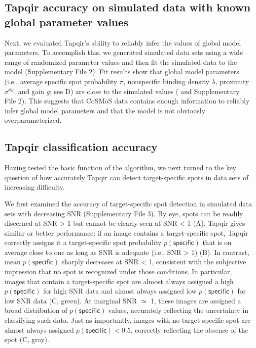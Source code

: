 \subsection{Tapqir accuracy on simulated data with known global parameter values}

Next, we evaluated Tapqir's ability to reliably infer the values of global model parameters. To  accomplish this, we generated simulated data sets using a wide range of randomized parameter values and then fit the simulated data to the model (Supplementary File 2). Fit results show that global model parameters (i.e., average specific spot probability $\pi$, nonspecific binding density $\lambda$, proximity $\sigma^{xy}$, and gain $g$; see D) are close to the simulated values ( and Supplementary File 2). This suggests that CoSMoS data contains enough information to reliably infer global model parameters and that the model is not obviously overparameterized. 

\subsection{Tapqir classification accuracy}

Having tested the basic function of the algorithm, we next turned to the key question of how accurately Tapqir can detect target-specific spots in data sets of increasing difficulty.

We first examined the accuracy of target-specific spot detection in simulated data sets with decreasing SNR (Supplementary File 3). By eye, spots can be readily discerned at SNR > 1 but cannot be clearly seen at SNR < 1 (A). Tapqir gives similar or better performance:  if an image contains a target-specific spot, Tapqir correctly assigns it a target-specific spot probability $p(\mathsf{specific})$ that is on average close to one as long as SNR is adequate (i.e., SNR > 1) (B).  In contrast, mean $p(\mathsf{specific})$ sharply decreases at SNR < 1, consistent with the subjective impression that no spot is recognized under those conditions.  In particular, images that contain a target-specific spot are almost always assigned a high $p(\mathsf{specific})$ for high SNR data and almost always assigned low $p(\mathsf{specific})$ for low SNR data (C, green).  At marginal SNR $\simeq$ 1, these images are assigned a broad distribution of $p(\mathsf{specific})$ values, accurately reflecting the uncertainty in classifying such data.  Just as importantly, images with no target-specific spot are almost always assigned $p(\mathsf{specific}) < 0.5$, correctly reflecting the absence of the spot (C, gray).

